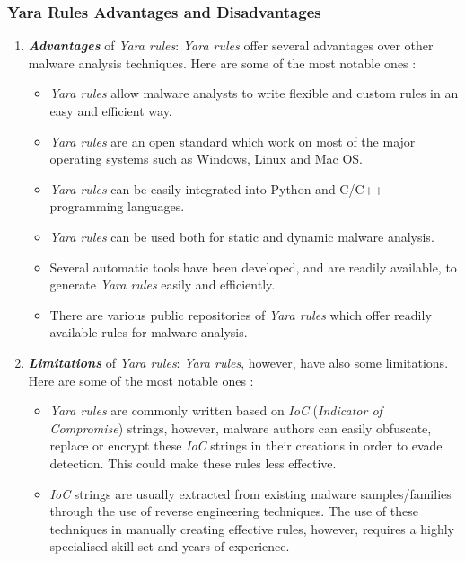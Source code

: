\documentclass[pdfa%
,cucitura%
]{toptesi}
\begin{document}
\subsubsection{Yara Rules Advantages and Disadvantages}
\begin{enumerate}
	\item \textbf{\textit{Advantages}} of \textit{Yara rules}:
	\textit{Yara rules} offer several advantages over other malware analysis techniques. Here are some of the most notable ones \cite{NaikEAGYRETE}:
	\begin{itemize}
		\item \textit{Yara rules} allow malware analysts to write flexible and custom rules in an easy and efficient way.
		
		\item \textit{Yara rules} are an open standard which work on most of the major operating systems such as Windows, Linux and Mac OS.
		
		\item \textit{Yara rules} can be easily integrated into Python and C/C++ programming languages.
		
		\item \textit{Yara rules} can be used both for static and dynamic malware analysis.
		
		\item Several automatic tools have been developed, and are readily available, to generate \textit{Yara rules} easily and efficiently.
		
		\item There are various public repositories of \textit{Yara rules} which offer readily available rules for malware analysis.
	\end{itemize}
	
	\item \textbf{\textit{Limitations}} of \textit{Yara rules}:
	\textit{Yara rules}, however, have also some limitations. Here are some of the most notable ones \cite{NaikEAGYRETE}:
	\begin{itemize}
		\item \textit{Yara rules} are commonly written based on \textit{IoC} (\textit{Indicator of Compromise}) strings, however, malware authors can easily obfuscate, replace or encrypt these \textit{IoC} strings in their creations in order to evade detection. This could make these rules less effective.
		
		\item \textit{IoC} strings are usually extracted from existing malware samples/families through the use of reverse engineering techniques. The use of these techniques in manually creating effective rules, however, requires a highly specialised skill-set and years of experience.
		

\end{itemize}
\end{enumerate}
\end{document}
